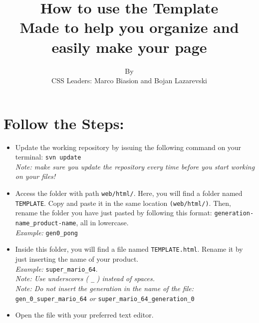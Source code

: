 \documentclass{article}
\title{\Huge{\textbf{How to use the Template}} \\ \normalsize{Made to help you organize and easily make your page}}
\author{\normalsize{By} \\ \large{CSS Leaders: Marco Biasion and Bojan Lazarevski}}
\date{}
\begin{document}
\maketitle

\section*{Follow the Steps:}
\begin{itemize}
    \item Update the working repository by issuing the following command on your terminal:
    \colorbox{grey!7}{\texttt{svn update}} \\
    \textit{Note: make sure you update the repository every time before you start working on your files!}
    
    \item Access the folder with path \colorbox{grey!7}{\texttt{web/html/}}. Here, you will find a folder named \colorbox{grey!7}{\texttt{TEMPLATE}}. Copy and paste it in the same location \colorbox{grey!7}{\texttt{(web/html/)}}. Then, rename the folder you have just pasted by following this format: \colorbox{grey!7}{\texttt{generation-name\_product-name}}, all in lowercase. \\
    \textit{Example:} \texttt{gen0\_pong}
    
    \item Inside this folder, you will find a file named \colorbox{grey!7}{\texttt{TEMPLATE.html}}. Rename it by just inserting the name of your product. \\
    \textit{Example: } \texttt{super\_mario\_64}. \\
    \textit{Note: Use underscores (} \texttt{\_} \textit{) instead of spaces.} \\
    \textit{Note: Do not insert the generation in the name of the file:} \texttt{gen\_0\_super\_mario\_64} \textit{or} \texttt{super\_mario\_64\_generation\_0}
    
    \item Open the file with your preferred text editor.
    

\end{itemize}
\end{document}
